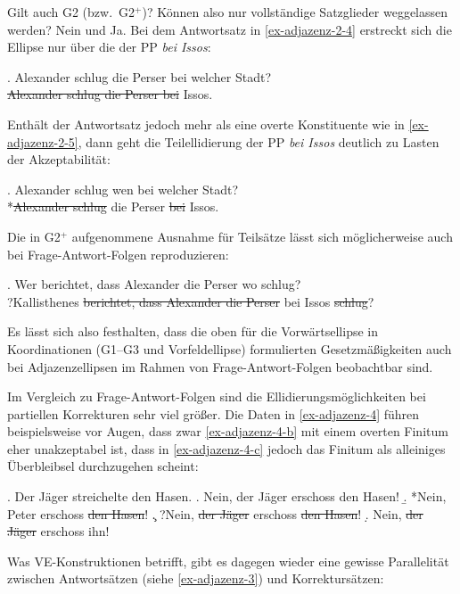 Gilt auch G2 (bzw.\ G2$^+$)? Können also nur vollständige Satzglieder weggelassen werden? Nein und Ja. Bei dem Antwortsatz in \ref{ex-adjazenz-2-4} erstreckt sich die Ellipse nur über die  der PP {\it bei Issos}:  

\ex. \label{ex-adjazenz-2-4} Alexander schlug die Perser bei welcher Stadt? \\
 \sout{Alexander schlug die Perser bei} Issos.

Enthält der Antwortsatz jedoch mehr als eine overte Konstituente wie in \ref{ex-adjazenz-2-5}, dann geht die Teilellidierung der PP {\it bei Issos} deutlich zu Lasten der Akzeptabilität: 

\ex. Alexander schlug wen bei welcher Stadt?\label{ex-adjazenz-2-5}  \\
 *\sout{Alexander schlug} die Perser \sout{bei} Issos.
 
Die in G2$^+$ aufgenommene Ausnahme für Teilsätze lässt sich möglicherweise auch bei Frage-Antwort-Folgen reproduzieren:

\ex. \label{ex-adjazenz-2-9} Wer berichtet, dass Alexander die Perser wo schlug? \\
?Kallisthenes \sout{berichtet, dass Alexander die Perser} bei Issos \sout{schlug}?

Es lässt sich also festhalten, dass die oben für die Vorwärtsellipse in Koordinationen (G1--G3 und Vorfeldellipse)  formulierten Gesetzmä\ss igkeiten auch bei Adjazenzellipsen im Rahmen von Frage-Antwort-Folgen beobachtbar sind. %

Im Vergleich zu Frage-Antwort-Folgen sind die Ellidierungsmöglichkeiten bei partiellen Korrekturen sehr viel grö\ss er. Die Daten in \ref{ex-adjazenz-4} führen beispielsweise vor Augen, dass zwar \ref{ex-adjazenz-4-b} mit einem overten Finitum eher unakzeptabel ist, dass in \ref{ex-adjazenz-4-c} jedoch das Finitum als alleiniges Überbleibsel durchzugehen scheint:   

\largerpage
\ex. \label{ex-adjazenz-4}Der Jäger streichelte den Hasen.
\a. Nein, der Jäger erschoss den Hasen!
\b. *Nein, Peter erschoss \sout{den Hasen}!\label{ex-adjazenz-4-b}
\c. ?Nein, \sout{der Jäger} erschoss \sout{den Hasen}!\label{ex-adjazenz-4-c}
\d. Nein, \sout{der Jäger} erschoss ihn!

Was VE-Konstruktionen betrifft, gibt es dagegen wieder eine gewisse Parallelität zwischen Antwortsätzen (siehe \ref{ex-adjazenz-3}) und Korrektursätzen: 

